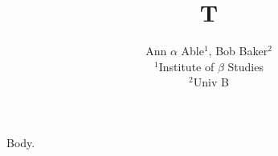 \documentclass{article}
\author{Ann $\alpha$ Able$^{1}$, Bob Baker$^{2}$\\ $^{1}$Institute of $\beta$ Studies\\ $^{2}$Univ B}
\title{T}
\begin{document}
\maketitle
Body.
\end{document}
